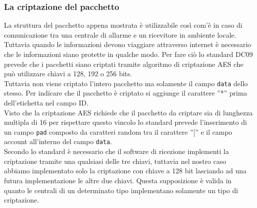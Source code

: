 \subsubsection{La criptazione del pacchetto}
La struttura del pacchetto appena mostrata è utilizzabile così com'è in caso di comunicazione tra una centrale di allarme e un ricevitore in ambiente locale. Tuttavia quando le informazioni devono viaggiare attraverso internet è necessario che le informazioni siano protette in qualche modo. Per fare ciò lo standard DC09 prevede che i pacchetti siano criptati tramite algoritmo di criptazione AES che può utilizzare chiavi a 128, 192 o 256 bits.\\
Tuttavia non viene criptato l'intero pacchetto ma solamente il campo \texttt{data} dello stesso. Per indicare che il pacchetto è criptato si aggiunge il carattere ''*'' prima dell'etichetta nel campo ID.\\
Visto che la criptazione AES richiede che il pacchetto da criptare sia di lunghezza multipla di 16 per rispettare questo vincolo lo standard prevede l'inserimento di un campo \texttt{pad} composto da caratteri random tra il carattere ''['' e il campo account all'interno del campo \texttt{data}.\\
Secondo lo standard è necessario che il software di ricezione implementi la criptazione tramite una qualsiasi delle tre chiavi, tuttavia nel nostro caso abbiamo implementato solo la criptazione con chiave a 128 bit lasciando ad una futura implementazione le altre due chiavi. Questa supposizione è valida in quanto le centrali di un determinato tipo implementano solamente un tipo di criptazione.
